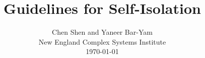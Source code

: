 \documentclass[onecolumn,journal]{IEEEtran}
\begin{document}
\title{\color{Brown} Guidelines for Self-Isolation \\
\vspace{-0.35ex}}
\author{Chen Shen and Yaneer Bar-Yam \\ New England Complex Systems Institute \\
 \today 
  \vspace{-14ex} \\ 

   
\bigskip
\bigskip

\textbf{}
 }
    
\maketitle


\flushbottom %



\thispagestyle{empty} %




\renewcommand{\thefootnote}{\fnsymbol{footnote}}
\end{document}

